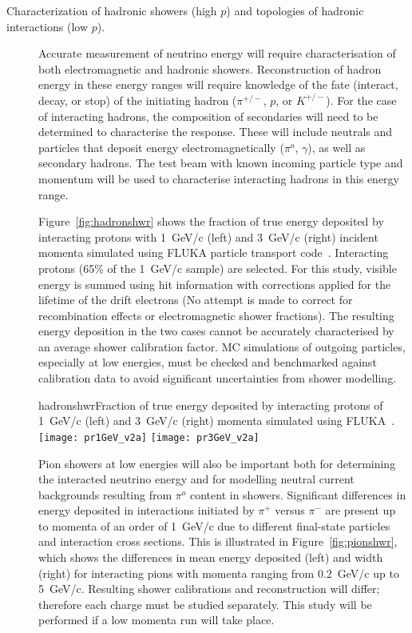 \begin{description}
\item [Characterization of hadronic showers (high $p$) and topologies of hadronic interactions (low $p$).]


Accurate measurement of neutrino energy will require characterisation of both electromagnetic and hadronic showers. Reconstruction of hadron energy in these energy ranges will require knowledge of the fate (interact, decay, or stop) of the initiating hadron ($\pi^{+/-}$, $p$, or $K^{+/-}$).
For the case of interacting hadrons, the composition of secondaries
will need to be determined to characterise the response. 
These will include neutrals and particles that deposit energy electromagnetically ($\pi^o$, $\gamma$), as well as
secondary hadrons. The test beam with known incoming particle type and momentum will be used
to characterise interacting hadrons in this energy range.


Figure~\ref{fig:hadronshwr} shows the fraction of true energy deposited by interacting protons with 1~GeV/c (left) and
3~GeV/c (right) incident momenta simulated using FLUKA particle transport code~\cite{fluka05}. 
Interacting protons (65\% of the 1~GeV/c sample) are selected.
For this study, visible energy is summed using hit information with corrections applied for the lifetime of the drift electrons (No attempt is made to correct for recombination effects or electromagnetic shower fractions). 
The resulting energy deposition in the two cases cannot be accurately characterised by an average shower calibration factor. MC simulations of outgoing particles, especially at low energies, must be checked and benchmarked against calibration data to avoid significant uncertainties from shower modelling. 

\begin{cdrfigure}{hadronshwr}{Fraction of true energy deposited by interacting protons of 1~GeV/c (left) and
3~GeV/c (right) momenta simulated using FLUKA~\cite{fluka05}.}
\texttt{[image: pr1GeV\_v2a]}
\texttt{[image: pr3GeV\_v2a]}
\end{cdrfigure}


Pion showers at low energies will also be important both for determining the interacted neutrino energy and for modelling neutral current backgrounds resulting from $\pi^o$ content in showers. Significant differences in energy deposited in interactions initiated by $\pi^+$ versus $\pi^-$  are present up to momenta of an order of 1~GeV/c due to different final-state particles and interaction cross sections. This is illustrated in  Figure~\ref{fig:pionshwr}, which shows the differences in mean energy deposited (left) and width (right)  for interacting pions with momenta ranging from 0.2~GeV/c up to 5~GeV/c.
Resulting shower calibrations and reconstruction will differ; therefore each charge must be studied separately. This study will be performed if a low momenta run will take place.  


\end{description}
